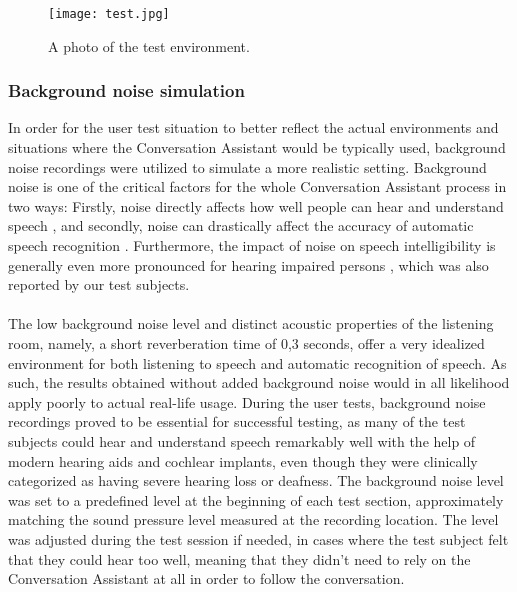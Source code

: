 \documentclass[english, 12pt, a4paper, pdftex, elec, utf8]{aaltothesis}
\begin{document}
\begin{figure}[h]
	\centering
	\texttt{[image: test.jpg]}
	\caption{A photo of the test environment.}
	\label{fig:photo}
\end{figure}

\subsubsection{Background noise simulation}

In order for the user test situation to better reflect the actual environments and situations where the Conversation Assistant would be typically used, background noise recordings were utilized to simulate a more realistic setting. Background noise is one of the critical factors for the whole Conversation Assistant process in two ways: Firstly, noise directly affects how well people can hear and understand speech \cite{pulkki2015communication}, and secondly, noise can drastically affect the accuracy of automatic speech recognition \cite{kallasjoki2016}. Furthermore, the impact of noise on speech intelligibility is generally even more pronounced for hearing impaired persons \cite{healy2016difficulty}, which was also reported by our test subjects. \\\\
The low background noise level and distinct acoustic properties of the listening room, namely, a short reverberation time of 0,3 seconds, offer a very idealized environment for both listening to speech and automatic recognition of speech. As such, the results obtained without added background noise would in all likelihood apply poorly to actual real-life usage. During the user tests, background noise recordings proved to be essential for successful testing, as many of the test subjects could hear and understand speech remarkably well with the help of modern hearing aids and cochlear implants, even though they were clinically categorized as having severe hearing loss or deafness. The background noise level was set to a predefined level at the beginning of each test section, approximately matching the sound pressure level measured at the recording location. The level was adjusted during the test session if needed, in cases where the test subject felt that they could hear too well, meaning that they didn't need to rely on the Conversation Assistant at all in order to follow the conversation. \\\\
\end{document}
